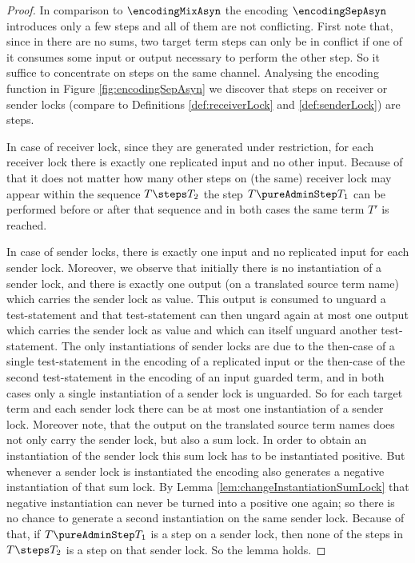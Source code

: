 \documentclass[]{llncs}
\begin{document}
\begin{proof}
	In comparison to $ \encodingMixAsyn $ the encoding $ \encodingSepAsyn $ introduces only a few \pure \admin steps and all of them are not conflicting. First note that, since in \piAsyn there are no sums, two target term steps can only be in conflict if one of it consumes some input or output necessary to perform the other step. So it suffice to concentrate on steps on the same channel. Analysing the encoding function in Figure \ref{fig:encodingSepAsyn} we discover that steps on receiver or sender locks (compare to Definitions \ref{def:receiverLock} and \ref{def:senderLock}) are \pure \admin steps.
	
	In case of receiver lock, since they are generated under restriction, for each receiver lock there is exactly one replicated input and no other input. Because of that it does not matter how many other steps on (the same) receiver lock may appear within the sequence $ T \steps T_2 $ the step $ T \pureAdminStep T_1 $ can be performed before or after that sequence and in both cases the same term $ T' $ is reached.
	
	In case of sender locks, there is exactly one input and no replicated input for each sender lock. Moreover, we observe that initially there is no instantiation of a sender lock, and there is exactly one output (on a translated source term name) which carries the sender lock as value. This output is consumed to unguard a test-statement and that test-statement can then ungard again at most one output which carries the sender lock as value and which can itself unguard another test-statement. The only instantiations of sender locks are due to the then-case of a single test-statement in the encoding of a replicated input or the then-case of the second test-statement in the encoding of an input guarded term, and in both cases only a single instantiation of a sender lock is unguarded. So for each target term and each sender lock there can be at most one instantiation of a sender lock. Moreover note, that the output on the translated source term names does not only carry the sender lock, but also a sum lock. In order to obtain an instantiation of the sender lock this sum lock has to be instantiated positive. But whenever a sender lock is instantiated the encoding also generates a negative instantiation of that sum lock. By Lemma \ref{lem:changeInstantiationSumLock} that negative instantiation can never be turned into a positive one again; so there is no chance to generate a second instantiation on the same sender lock. Because of that, if $ T \pureAdminStep T_1 $ is a step on a sender lock, then none of the steps in $ T \steps T_2 $ is a step on that sender lock. So the lemma holds.
	

\end{proof}
\end{document}
